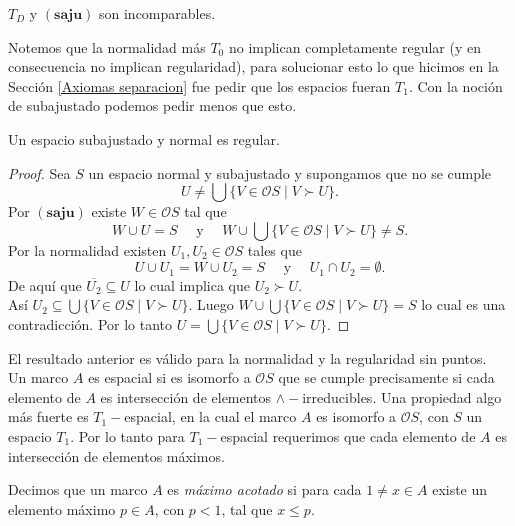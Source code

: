 \documentclass{comunicaciones}
\begin{document}
\begin{cor}
    $T_D$ y $(\mathbf{saju})$ son incomparables.
\end{cor}

Notemos que la normalidad más $T_0$ no implican completamente regular (y en consecuencia no implican regularidad), para solucionar esto lo que hicimos en la Sección \ref{Axiomas separacion} fue pedir que los espacios fueran $T_1$. Con la noción de subajustado podemos pedir menos que esto.

\begin{prop}
    Un espacio subajustado y normal es regular.
\end{prop}

\begin{proof}
    Sea $S$ un espacio normal y subajustado y supongamos que no se cumple 
    \[
    U\neq \bigcup\{V\in \mathcal{O}S\mid V\succ U\}.
    \]
    Por $(\mathbf{saju})$ existe $W\in\mathcal{O}S$ tal que 
    \[
    W\cup U=S\quad\mbox{ y }\quad W\cup \bigcup\{V\in \mathcal{O}S\mid V\succ U\}\neq S.
    \]
    Por la normalidad existen $U_1, U_2\in \mathcal{O}S$ tales que 
    \[
    U\cup U_1=W\cup U_2=S\quad\mbox{ y }\quad U_1\cap U_2=\emptyset.
    \]
    De aquí que $\overline{U_2}\subseteq U$ lo cual implica que $U_2\succ U$. \\
    
    \noindent
    Así $U_2\subseteq\bigcup\{V\in \mathcal{O}S\mid V\succ U\}$. Luego $W\cup\bigcup\{V\in \mathcal{O}S\mid V\succ U\}=S$ lo cual es una contradicción. Por lo tanto $U=\bigcup\{V\in \mathcal{O}S\mid V\succ U\}$.
    \end{proof}
    
El resultado anterior es válido para la normalidad y la regularidad sin puntos.\\

Un marco $A$ es espacial si es isomorfo a $\mathcal{O}S$ que se cumple precisamente si cada elemento de $A$ es intersección de elementos $\wedge-$irreducibles. Una propiedad algo más fuerte es $T_1-$espacial, en la cual el marco $A$ es isomorfo a $\mathcal{O}S$, con $S$ un espacio $T_1$. Por lo tanto para $T_1-$espacial requerimos que cada elemento de $A$ es intersección de elementos máximos.

\begin{dfn}\label{Maximoacotado}
    Decimos que un marco $A$ es \emph{máximo acotado} si para cada $1\neq x\in A$ existe un elemento máximo $p\in A$, con $p< 1$, tal que $x\leq p$.
\end{dfn}
\end{document}
